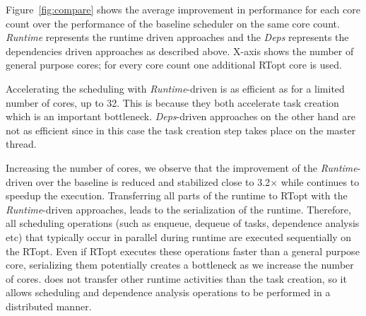 
Figure~\ref{fig:compare} shows the average improvement in performance for each core count over the performance of the baseline scheduler on the same core count. 
\textit{Runtime} represents the runtime driven approaches and the \textit{Deps} represents the dependencies driven approaches as described above.
X-axis shows the number of general purpose cores; for every core count one additional RTopt core is used.

Accelerating the scheduling with \textit{Runtime}-driven is as efficient as {\proposal} for a limited number of cores, up to 32.
This is because they both accelerate task creation which is an important bottleneck. 
\textit{Deps}-driven approaches on the other hand are not as efficient since in this case the task creation step takes place on the master thread.

Increasing the number of cores, we observe that the improvement of the \textit{Runtime}-driven over the baseline is reduced and stabilized close to 3.2$\times$ while {\proposal} continues to speedup the execution. 
Transferring all parts of the runtime to RTopt with the  \textit{Runtime}-driven approaches, leads to the serialization of the runtime.
Therefore, all scheduling operations (such as enqueue, dequeue of tasks, dependence analysis etc) that typically occur in parallel during runtime are executed sequentially on the RTopt.
Even if RTopt executes these operations faster than a general purpose core, serializing them potentially creates a bottleneck as we increase the number of cores.
{\proposal} does not transfer other runtime activities than the task creation, so it allows scheduling and dependence analysis operations to be performed in a distributed manner.

